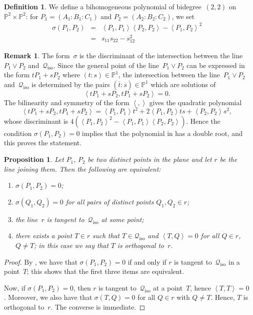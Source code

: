 \documentclass{amsart}
\theoremstyle{plain}
\newtheorem{prop}[lemma]{Proposition}
\theoremstyle{definition}
\newtheorem{definition}[lemma]{Definition}
\newtheorem{rmk}[lemma]{Remark}
\newcommand{\p}{\mathbb{P}}
\newcommand{\iso}{\mathcal{Q}_{\mathrm{iso}}}
\newcommand{\scl}[2]{\left\langle {#1}, {#2} \right\rangle}
\begin{document}
\begin{definition}
\label{definition:sigma}
We define a bihomogeneous polynomial of bidegree~$(2,2)$ on $\p^2 \times \p^2$: for $P_1 = (A_1: B_1: C_1)$ and $P_2 = (A_2: B_2: C_2)$, we set
%
\begin{eqnarray}
\label{formula:sigma}
  \sigma(P_1, P_2) &=& \scl{P_1}{P_1} \scl{P_2}{P_2} - \scl{P_1}{P_2}^2 \\
   & = & s_{11}s_{22}-s_{12}^2
\end{eqnarray}
\end{definition}

\begin{rmk}
\label{rmk:sigma_discr}
The form~$\sigma$ is the discriminant of the intersection between the line~$P_1 \vee P_2$ and~$\iso$.
Since the general point of the line~$P_1 \vee P_2$ can be expressed in the form
$t P_1 + sP_2$ where $(t:s) \in \p^1$, the intersection between the line~$P_1 \vee P_2$
and~$\iso$ is determined by the pairs $(\overline{t}: \overline{s}) \in \p^1$ which are solutions of
%
\[
  \scl{t P_1 + sP_2}{t P_1 + sP_2} =0.
\]
%
The bilinearity and symmetry of the form $\scl{}{}$ gives the quadratic polynomial
%
\begin{equation}
\label{eq:intersection_isotropic}
  \scl{t P_1 + sP_2}{t P_1 + sP_2} =
  \scl{P_1}{P_1} t^2 + 2\scl{P_1}{P_2} ts + \scl{P_2}{P_2}s^2,
\end{equation}
%
whose discriminant is $4 ( \scl{P_1}{P_2}^2 - \scl{P_1}{P_1} \scl{P_2}{P_2})$.
Hence the condition $\sigma(P_1, P_2)=0$ implies that the polynomial in 
has a double root, and this proves the statement.
\end{rmk}

\begin{prop}
\label{proposition:sigma_tangency}
Let $P_1$, $P_2$ be two distinct points in the plane and let $r$ be the line joining them.
Then the following are equivalent:
%
\begin{enumerate}
  \item $\sigma(P_1, P_2) = 0$;
  \item $\sigma(Q_1, Q_2) = 0$ for all pairs of distinct points $Q_1, Q_2 \in r$;
  \item the line~$r$ is tangent to~$\iso$ at some point;
  \item there exists a point $T \in r$ such that $T \in \iso$ and $\scl{T}{Q} = 0$ for all $Q \in r$, $Q \neq T$; in this case we say that $T$ is \emph{orthogonal} to~$r$.
\end{enumerate}
%
\end{prop}
\begin{proof}
By , we have that $\sigma(P_1, P_2) = 0$ if and only if $r$ is tangent to~$\iso$ in a point~$T$; this shows that the first three items are equivalent.

Now, if $\sigma(P_1, P_2) = 0$, then $r$ is tangent to~$\iso$ at a point~$T$, hence $\scl{T}{T} = 0$.
Moreover, we also have that $\sigma(T, Q) = 0$ for all $Q \in r$ with $Q \neq T$.
Hence, $T$ is orthogonal to~$r$.
The converse is immediate.
\end{proof}
\end{document}
